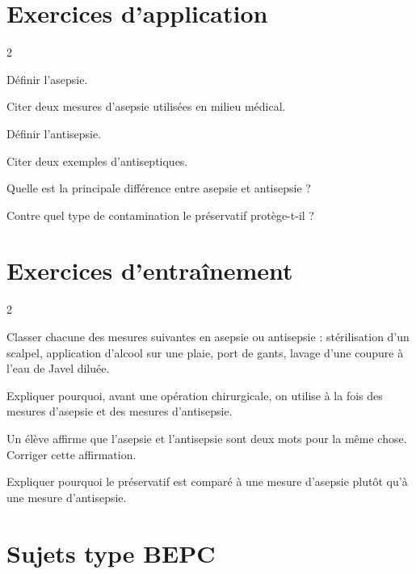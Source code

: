 \section{Exercices d'application}
\begin{multicols}{2}

\exo{} Définir l'asepsie.

\exo{} Citer deux mesures d'asepsie utilisées en milieu médical.

\exo{} Définir l'antisepsie.

\exo{} Citer deux exemples d'antiseptiques.

\exo{} Quelle est la principale différence entre asepsie et antisepsie ?

\exo{} Contre quel type de contamination le préservatif protège-t-il ?

\end{multicols}

\section{Exercices d'entraînement}
\begin{multicols}{2}

\exo{} Classer chacune des mesures suivantes en asepsie ou antisepsie :
stérilisation d'un scalpel, application d'alcool sur une plaie, port de gants,
lavage d'une coupure à l'eau de Javel diluée.

\exo{} Expliquer pourquoi, avant une opération chirurgicale, on utilise à la
fois des mesures d'asepsie et des mesures d'antisepsie.

\exo{} Un élève affirme que l'asepsie et l'antisepsie sont deux mots pour la
même chose. Corriger cette affirmation.

\exo{} Expliquer pourquoi le préservatif est comparé à une mesure d'asepsie
plutôt qu'à une mesure d'antisepsie.

\end{multicols}

\section{Sujets type BEPC}

